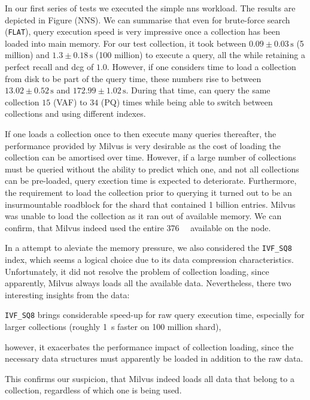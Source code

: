 In our first series of tests we executed the simple \acrshort{nns} workload. The results are depicted in Figure  (NNS). We can summarise that even for brute-force search (\texttt{FLAT}), query execution speed is very impressive once a collection has been loaded into main memory. For our test collection, it took between $0.09 \pm 0.03 \, \si{\second}$ (5 million) and $1.3 \pm 0.18 \, \si{\second}$ (100 million) to execute a query, all the while retaining a perfect recall and \acrshort{dcg} of $1.0$. However, if one considers time to load a collection from disk to be part of the query time, these numbers rise to between $13.02 \pm 0.52 \, \si{\second}$ and $172.99 \pm 1.02 \, \si{\second}$. During that time, \cottontail{} can query the same collection $15$ (VAF) to $34$ (PQ) times while being able to switch between collections and using different indexes.

If one loads a collection once to then execute many queries thereafter, the performance provided by Milvus is very desirable as the cost of loading the collection can be amortised over time. However, if a large number of collections must be queried without the ability to predict which one, and not all collections can be pre-loaded, query exection time is expected to deteriorate. Furthermore, the requirement to load the collection prior to querying it turned out to be an insurmountable roadblock for the shard that contained 1 billion entries. Milvus was unable to load the collection as it ran out of available memory. We can confirm, that Milvus indeed used the entire \SI{376}{\giga\byte} available on the node.

In a attempt to aleviate the memory pressure, we also considered the \texttt{IVF\_SQ8} index, which seems a logical choice due to its data compression characteristics. Unfortunately, it did not resolve the problem of collection loading, since apparently, Milvus always loads all the available data. Nevertheless, there two interesting insights from the data:
\begin{enumerate*}[label=(\roman*)]
    \item \texttt{IVF\_SQ8} brings considerable speed-up for raw query execution time, especially for larger collections (roughly \SI{1}{\second} faster on 100 million shard),
    \item however, it exacerbates the performance impact of collection loading, since the necessary data structures must apparently be loaded in addition to the raw data.
\end{enumerate*} This confirms our suspicion, that Milvus indeed loads all data that belong to a collection, regardless of which one is being used.

